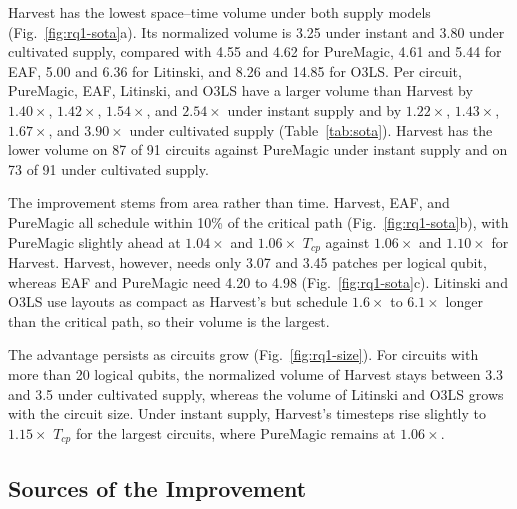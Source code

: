 Harvest has the lowest space--time volume under both supply models (Fig.~\ref{fig:rq1-sota}a).
Its normalized volume is 3.25 under instant and 3.80 under cultivated supply, compared with 4.55 and 4.62 for PureMagic, 4.61 and 5.44 for EAF, 5.00 and 6.36 for Litinski, and 8.26 and 14.85 for O3LS.
Per circuit, PureMagic, EAF, Litinski, and O3LS have a larger volume than Harvest by $1.40\times$, $1.42\times$, $1.54\times$, and $2.54\times$ under instant supply and by $1.22\times$, $1.43\times$, $1.67\times$, and $3.90\times$ under cultivated supply (Table~\ref{tab:sota}).
Harvest has the lower volume on 87 of 91 circuits against PureMagic under instant supply and on 73 of 91 under cultivated supply.

The improvement stems from area rather than time.
Harvest, EAF, and PureMagic all schedule within 10\% of the critical path (Fig.~\ref{fig:rq1-sota}b), with PureMagic slightly ahead at $1.04\times$ and $1.06\times$ $T_{cp}$ against $1.06\times$ and $1.10\times$ for Harvest.
Harvest, however, needs only 3.07 and 3.45 patches per logical qubit, whereas EAF and PureMagic need 4.20 to 4.98 (Fig.~\ref{fig:rq1-sota}c).
Litinski and O3LS use layouts as compact as Harvest's but schedule $1.6\times$ to $6.1\times$ longer than the critical path, so their volume is the largest.

The advantage persists as circuits grow (Fig.~\ref{fig:rq1-size}).
For circuits with more than 20 logical qubits, the normalized volume of Harvest stays between 3.3 and 3.5 under cultivated supply, whereas the volume of Litinski and O3LS grows with the circuit size.
Under instant supply, Harvest's timesteps rise slightly to $1.15\times$ $T_{cp}$ for the largest circuits, where PureMagic remains at $1.06\times$.


\subsection{Sources of the Improvement}
\label{sec:eval-contributions}


